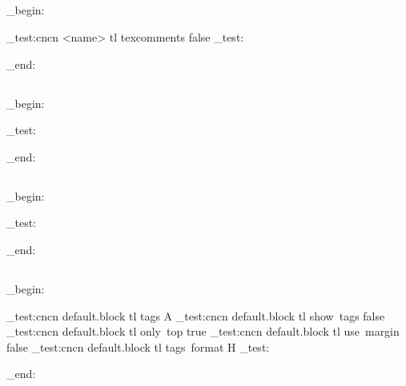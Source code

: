 \subsection{}

\ExplSyntaxOn
\group_begin:
\ExplSyntaxOff



\ExplSyntaxOn
\CDR_test:cncn { <name> } { tl } { texcomments } { false }
\CDR_test:

\group_end:
\ExplSyntaxOff

\subsection{}
\ExplSyntaxOn
\group_begin:

\CDRSet{
}

\CDR_test:

\group_end:
\ExplSyntaxOff

\subsection{}
\ExplSyntaxOn
\group_begin:

\CDRSet{
}

\CDR_test:

\group_end:
\ExplSyntaxOff

\subsection{}
\ExplSyntaxOn
\group_begin:


\CDR_test:cncn { default.block } { tl } { tags } { A }
\CDR_test:cncn { default.block } { tl } { show~tags } { false }
\CDR_test:cncn { default.block } { tl } { only~top } { true }
\CDR_test:cncn { default.block } { tl } { use~margin } { false }
\CDR_test:cncn { default.block } { tl } { tags~format } { H }
\CDR_test:

\group_end:
\ExplSyntaxOff

\subsection{}

